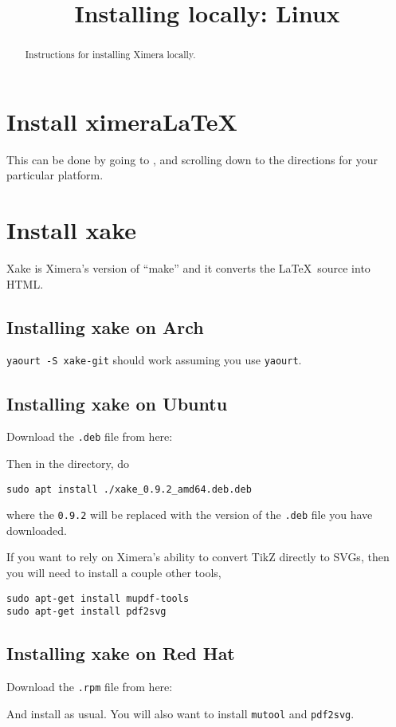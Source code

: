 \documentclass{ximera}
\title{Installing locally: Linux}
\begin{document}
\begin{abstract}
Instructions for installing Ximera locally.
\end{abstract}
\maketitle



\section{Install ximeraLaTeX}

This can be done by going to , and scrolling
down to the directions for your particular platform.




\section{Install xake}

Xake is Ximera's version of ``make'' and it converts the
\LaTeX\ source into HTML.

\subsection{Installing xake on Arch}

\verb!yaourt -S xake-git! should work assuming you use \texttt{yaourt}.

  
\subsection{Installing xake on Ubuntu}

Download the \verb|.deb| file from here:


Then in the directory, do

\begin{verbatim}
sudo apt install ./xake_0.9.2_amd64.deb.deb
\end{verbatim}

where the \verb|0.9.2| will be replaced with the version of the
\verb|.deb| file you have downloaded.

If you want to rely on Ximera's ability to convert TikZ directly to SVGs, then you will need to install a couple other tools,
\begin{verbatim}
sudo apt-get install mupdf-tools
sudo apt-get install pdf2svg
\end{verbatim}

\subsection{Installing xake on Red Hat}

Download the \verb|.rpm| file from here:


And install as usual.  You will also want to install \verb|mutool| and \verb|pdf2svg|.
\end{document}
